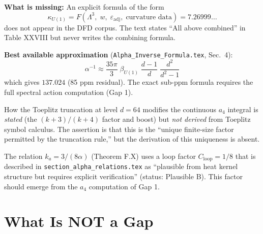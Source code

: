 \documentclass[12pt,a4paper]{article}
\begin{document}
\begin{tcolorbox}[colback=orange!5!white,colframe=orange!60!black,
title={GAP 2: How the eight Table XXVIII components combine}]
\textbf{What is missing:} An explicit formula of the form
\begin{equation*}
\kappa_{U(1)} = F\!\left(\Lambda^3,\; w,\; \varepsilon_{\mathrm{adj}},\;
\text{curvature data}\right) = 7.26999\ldots
\end{equation*}
does not appear in the DFD corpus.  The text states ``All above combined''
in Table XXVIII but never writes the combining formula.

\textbf{Best available approximation}
(\texttt{Alpha\_Inverse\_Formula.tex}, Sec.~4):
\begin{equation*}
\alpha^{-1} \approx \frac{35\pi}{3}\;\beta_{U(1)}\;\frac{d-1}{d}
\;\frac{d^2}{d^2-1}
\end{equation*}
which gives $137.024$ (85 ppm residual).  The exact sub-ppm formula
requires the full spectral action computation (Gap 1).
\end{tcolorbox}

\begin{tcolorbox}[colback=orange!5!white,colframe=orange!60!black,
title={GAP 3: Toeplitz modification of $a_4$ not derived from first principles}]
How the Toeplitz truncation at level $d = 64$ modifies the continuous
$a_4$ integral is \textit{stated} (the $(k+3)/(k+4)$ factor and boost)
but \textit{not derived} from Toeplitz symbol calculus.  The assertion
is that this is the ``unique finite-size factor permitted by the
truncation rule,'' but the derivation of this uniqueness is absent.
\end{tcolorbox}

\begin{tcolorbox}[colback=orange!5!white,colframe=orange!60!black,
title={GAP 4: $C_{\mathrm{loop}} = 1/8$ status}]
The relation $k_a = 3/(8\alpha)$ (Theorem F.X) uses a loop factor
$C_{\mathrm{loop}} = 1/8$ that is described in
\texttt{section\_alpha\_relations.tex} as ``plausible from heat kernel
structure but requires explicit verification'' (status: Plausible B).
This factor should emerge from the $a_4$ computation of Gap 1.
\end{tcolorbox}

\section{What Is NOT a Gap}
\label{sec:not-gaps}
\end{document}

